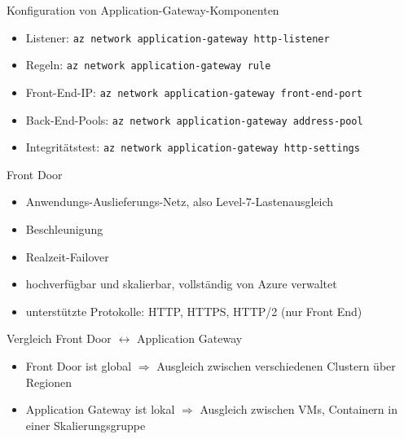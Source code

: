 \begin{flashcard}[Definition]{Konfiguration von Application-Gateway-Komponenten}
    \begin{itemize}
        \item Listener: \texttt{az network application-gateway http-listener}
        \item Regeln: \texttt{az network application-gateway rule}
        \item Front-End-IP: \texttt{az network application-gateway front-end-port}
        \item Back-End-Pools: \texttt{az network application-gateway address-pool}
        \item Integritätstest: \texttt{az network application-gateway http-settings}
    \end{itemize}
\end{flashcard}


\begin{flashcard}[Definition]{Front Door}
    \begin{itemize}
        \item Anwendungs-Auslieferungs-Netz, also Level-7-Lastenausgleich
        \item Beschleunigung
        \item Realzeit-Failover
        \item hochverfügbar und skalierbar, vollständig von Azure verwaltet
        \item unterstützte Protokolle: HTTP, HTTPS, HTTP/2 (nur Front End)
    \end{itemize}
\end{flashcard}

\begin{flashcard}[Definition]{Vergleich Front Door $\leftrightarrow$ Application Gateway}
    \begin{itemize}
        \item Front Door ist global\newline
            $\Rightarrow$ Ausgleich zwischen verschiedenen Clustern über Regionen
        \item Application Gateway ist lokal\newline
            $\Rightarrow$ Ausgleich zwischen VMs, Containern in einer Skalierungsgruppe
    \end{itemize}
\end{flashcard}

